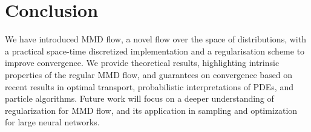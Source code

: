 \section{Conclusion}


We have introduced MMD flow, a novel flow over the space of distributions, with a practical space-time discretized implementation and a regularisation scheme to improve convergence. We provide theoretical results, highlighting intrinsic properties of the regular MMD flow, and guarantees on convergence based on  recent results in optimal transport, probabilistic interpretations of PDEs, and particle algorithms. Future work will focus on a deeper understanding of  regularization for  MMD flow,
and its application in sampling and optimization for large neural networks.

